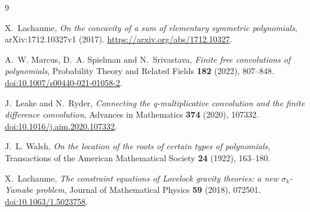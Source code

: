 \documentclass[11pt]{article}
\begin{document}
\begin{thebibliography}{9}
\footnotesize
\raggedright

X.~Lachaume,
\emph{On the concavity of a sum of elementary symmetric polynomials},
arXiv:1712.10327v1 (2017).
\url{https://arxiv.org/abs/1712.10327}.

A.~W. Marcus, D.~A. Spielman and N.~Srivastava,
\emph{Finite free convolutions of polynomials},
Probability Theory and Related Fields \textbf{182} (2022), 807--848.
\href{https://doi.org/10.1007/s00440-021-01058-2}{doi:10.1007/s00440-021-01058-2}.

J.~Leake and N.~Ryder,
\emph{Connecting the q-multiplicative convolution and the finite difference convolution},
Advances in Mathematics \textbf{374} (2020), 107332.
\href{https://doi.org/10.1016/j.aim.2020.107332}{doi:10.1016/j.aim.2020.107332}.

J.~L. Walsh,
\emph{On the location of the roots of certain types of polynomials},
Transactions of the American Mathematical Society \textbf{24} (1922), 163--180.

X.~Lachaume,
\emph{The constraint equations of Lovelock gravity theories: a new
$\sigma_k$-Yamabe problem},
Journal of Mathematical Physics \textbf{59} (2018), 072501.
\href{https://doi.org/10.1063/1.5023758}{doi:10.1063/1.5023758}.

\end{thebibliography}
\end{document}
